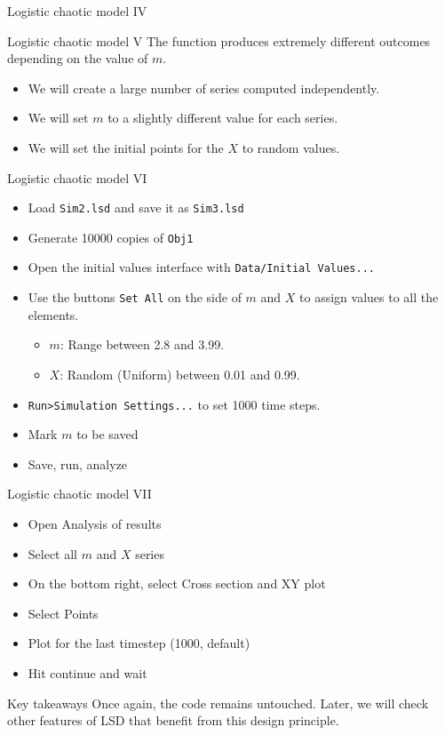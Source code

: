\documentclass[bigger,aspectratio=169]{beamer}
\begin{document}
\begin{frame}[label={sec:org2499772}]{Logistic chaotic model IV}
\begin{center}

\end{center}
\end{frame}
\begin{frame}[label={sec:org87a8cb4}]{Logistic chaotic model V}
The function produces \alert{extremely} different outcomes depending on the value of \alert{\(m\)}.

\begin{itemize}
\item We will create a large number of series computed independently.
\item We will set \(m\) to a slightly different value for each series.
\item We will set the \alert{initial} points for the \(X\) to random values.
\end{itemize}
\end{frame}
\begin{frame}[label={sec:org3a0a6ec},fragile]{Logistic chaotic model VI}
 \begin{itemize}
\item Load \texttt{Sim2.lsd} and save it as \texttt{Sim3.lsd}
\item Generate \alert{10000} copies of \texttt{Obj1}
\item Open the initial values interface with \texttt{Data/Initial Values...}
\item Use the buttons \texttt{Set All} on the side of \(m\) and \(X\) to assign values to all the elements.
\begin{itemize}
\item \(m\): \alert{Range} between 2.8 and 3.99.
\item \(X\): Random (Uniform) between 0.01 and 0.99.
\end{itemize}
\item \texttt{Run>Simulation Settings...} to set 1000 time steps.
\item Mark \(m\) to be saved
\item Save, run, analyze
\end{itemize}
\end{frame}
\begin{frame}[label={sec:org95aa84a}]{Logistic chaotic model VII}
\begin{itemize}
\item Open Analysis of results
\item Select all \(m\) and \(X\) series
\item On the bottom right, select \alert{Cross section} and \alert{XY plot}
\item Select \alert{Points}
\item Plot for the last timestep (1000, default)
\item Hit continue and wait
\end{itemize}
\begin{block}{Key takeaways}
Once again, the code remains \alert{untouched}.
Later, we will check other features of LSD that benefit from this design principle.
\end{block}
\end{frame}
\end{document}
